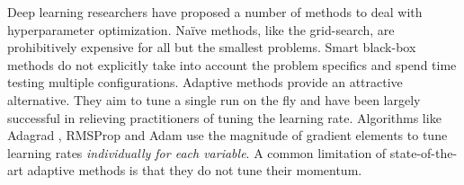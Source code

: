 Deep learning researchers have proposed a number of methods to deal with hyperparameter optimization. 
Na\"ive methods, like the grid-search,
are prohibitively expensive for all but the smallest problems. 
Smart black-box methods \cite{bergstra2012random,snoek2012practical}
do not explicitly take into account the problem specifics and spend time testing multiple configurations.
Adaptive methods provide an attractive alternative.
They aim to tune a single run on the fly and have been largely successful in relieving practitioners of tuning the learning rate. 
Algorithms like Adagrad \cite{duchi2011adaptive}, RMSProp \cite{tieleman2012lecture} and Adam \cite{kingma2014adam} use the magnitude of gradient elements to tune learning rates {\em individually for each variable}. A common limitation of state-of-the-art adaptive methods is that they do not tune their momentum.


